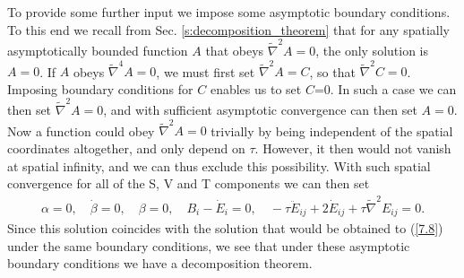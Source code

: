 To provide some further input we impose some asymptotic boundary conditions. To this end  we recall from Sec. \ref{s:decomposition_theorem} that for any spatially asymptotically bounded function $A$ that obeys $\tilde{\nabla}^2A=0$, the only solution is $A=0$. If $A$ obeys $\tilde{\nabla}^4A=0$, we must first set $\tilde{\nabla}^2A=C$, so that $\tilde{\nabla}^2C=0$. Imposing boundary conditions for $C$ enables us to set $C$=0. In such a case we can then set $\tilde{\nabla}^2A=0$, and with sufficient asymptotic convergence can then set $A=0$. Now a function could obey $\tilde{\nabla}^2A=0$ trivially by being independent of the spatial coordinates altogether, and only depend on $\tau$. However, it then would not vanish at spatial infinity, and we can thus exclude this possibility. With such spatial convergence for all of the S, V and T components we can then set 
%
\begin{eqnarray}
\alpha=0,\quad \dot{\beta}=0,\quad \beta =0,\quad B_i-\dot{E}_i=0,\quad -\tau\ddot{E}_{ij}+2\dot{E}_{ij}+\tau\tilde{\nabla}^2E_{ij}=0.
\label{7.17}
\end{eqnarray}
%
Since this solution coincides with the solution that would be obtained to (\ref{7.8}) under the same boundary conditions, we see that under these asymptotic boundary conditions we have a decomposition theorem.


